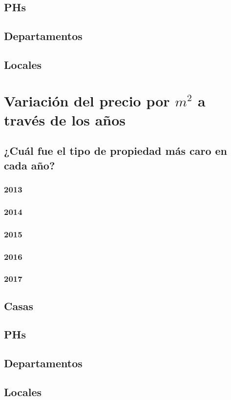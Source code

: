 \documentclass[a4paper, 10pt]{article}
\begin{document}
			\subsection{PHs}
			\subsection{Departamentos}
			\subsection{Locales}
		\section{Variación del precio por $m^2$ a través de los años}
			\subsection{¿Cuál fue el tipo de propiedad más caro en cada año?}
				\subsubsection{2013}
				\subsubsection{2014}
				\subsubsection{2015}
				\subsubsection{2016}
				\subsubsection{2017}
			\subsection{Casas}
			\subsection{PHs}
			\subsection{Departamentos}
			\subsection{Locales}
		
\end{document}

